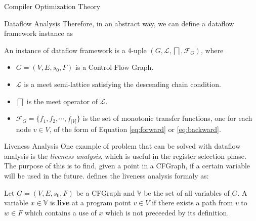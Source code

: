 \begin{section}{Compiler Optimization Theory}
\begin{subsection}{Dataflow Analysis}
	Therefore, in an abstract way, we can define a dataflow framework instance as
	\begin{definition}
		An instance of dataflow framework is a 4-uple $(G, \mathcal{L}, \bigsqcap, \mathcal{F}_G)$,
		where
		\begin{itemize}
			\item $G = (V, E, s_0, F)$ is a Control-Flow Graph.
			\item $\mathcal{L}$ is a meet semi-lattice satisfying the descending chain condition.
			\item $\bigsqcap$ is the meet operator of $\mathcal{L}$.
			\item $\mathcal{F}_G = \{f_1, f_2, \cdots, f_{|V|}\}$ is the set of monotonic transfer
			functions, one for each node $v \in V$, of the form of Equation \ref{eq:forward} or \ref{eq:backward}.
		\end{itemize}
	\end{definition}

	

	\begin{subsubsection}{Liveness Analysis}
		One example of problem that can be solved with dataflow analysis is the \textit{liveness analysis},
		which is useful in the register selection phase. The purpose of this is to find, given a point
		in a CFGraph, if a certain variable will be used in the future. \cite{khedker2009data} defines the liveness analysis formaly as:
\begin{definition}
	Let $G = (V, E, s_0, F)$ be a CFGraph and $\mathbb{V}$ be the set of all variables
	of $G$. A variable $x \in \mathbb{V}$ is \textbf{live} at a program point $v \in V$
	if there exists a path from $v$ to $w \in F$ which contains a use of $x$ which is
	not preceeded by its definition.
\end{definition}


\end{subsubsection}
\end{subsection}
\end{section}
